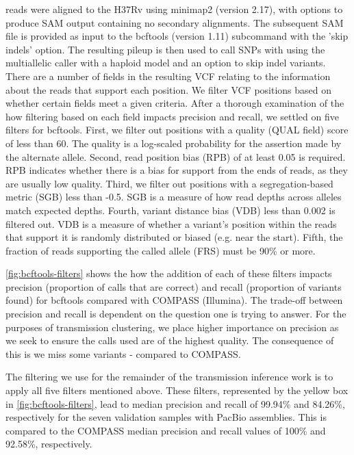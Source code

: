 \ont{} reads were aligned to the H37Rv using minimap2 (version 2.17), with options to produce SAM output containing no secondary alignments. The subsequent SAM file is provided as input to the bcftools (version 1.11) subcommand  with the 'skip indels' option. The resulting pileup is then used to call SNPs with  using the multiallelic caller with a haploid model and an option to skip indel variants.
There are a number of fields in the resulting VCF relating to the information about the reads that support each position. We filter VCF positions based on whether certain fields meet a given criteria.
After a thorough examination of the how filtering based on each field impacts precision and recall, we settled on five filters for bcftools. First, we filter out positions with a quality (QUAL field) score of less than 60. The quality is a log-scaled probability for the assertion made by the alternate allele. Second, read position bias (RPB) of at least 0.05 is required. RPB indicates whether there is a bias for support from the ends of reads, as they are usually low quality. Third, we filter out positions with a segregation-based metric (SGB) less than -0.5. SGB is a measure of how read depths across alleles match expected depths. Fourth, variant distance bias (VDB) less than 0.002 is filtered out. VDB is a measure of whether a variant's position within the reads that support it is randomly distributed or biased (e.g. near the start). Fifth, the fraction of reads supporting the called allele (FRS) must be 90\% or more.

\autoref{fig:bcftools-filters} shows the how the addition of each of these filters impacts precision (proportion
of calls that are correct) and recall (proportion of variants found) for bcftools compared with COMPASS (Illumina). The trade-off between
precision and recall is dependent on the question one is trying to
answer. For the purposes of transmission clustering, we place higher importance on
precision as we seek to ensure the calls used are of the highest
quality. The consequence of this is we miss some variants - compared to
COMPASS.

The filtering we use for the remainder of the transmission inference
work is to apply all five filters mentioned above. These filters, represented by the yellow box in
\autoref{fig:bcftools-filters}, lead to median precision and
recall of 99.94\% and 84.26\%, respectively for the seven validation
samples with PacBio assemblies. This is compared to the COMPASS median precision and recall values
of 100\% and 92.58\%, respectively.

